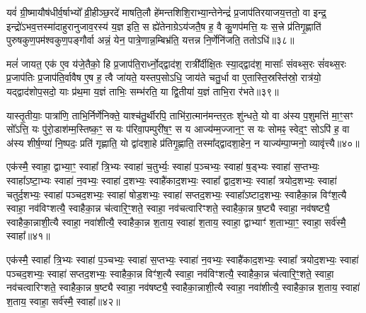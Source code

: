 यवं॑ ग्री॒ष्मायौष॑धीर्व॒र्\mbox{}षाभ्यो᳚ व्री॒हीञ्छ॒रदे॑ माषति॒लौ हे॑मन्तशिशि॒राभ्या॒न्तेनेन्द्रं॑ प्र॒जाप॑तिरयाजय॒त्ततो॒ वा इन्द्र॒ इन्द्रो॑\-ऽभव॒त्तस्मा॑दाहुरानुजाव॒रस्य॑ य॒ज्ञ इति॒ स ह्ये॑तेनाग्रे\-ऽय॑जतै॒ष ह॒ वै कु॒णप॑मत्ति॒ यः स॒त्त्रे प्र॑तिगृ॒ह्णाति॑ पुरुषकुण॒पम॑श्वकुण॒पङ्गौर्वा अन्नं॒ येन॒ पात्रे॒णान्न॒म्बिभ्र॑ति॒ यत्तन्न नि॒र्णेनि॑जति॒ ततो\-ऽधि॑॥३८॥

मलं॑ जायत॒ एक॑ ए॒व य॑जे॒तैको॒ हि प्र॒जाप॑ति॒रार्ध्नो॒द्द्वाद॑श॒ रात्री᳚र्दीक्षि॒तः स्या॒द्द्वाद॑श॒ मासाः᳚ संवथ्स॒रः सं॑वथ्स॒रः प्र॒जाप॑तिः प्र॒जाप॑ति॒र्वावैष ए॒ष ह॒ त्वै जा॑यते॒ यस्तप॒सो\-ऽधि॒ जाय॑ते चतु॒र्धा वा ए॒तास्ति॒स्रस्ति॑स्रो॒ रात्र॑यो॒ यद्द्वाद॑शोप॒सदो॒ याः प्र॑थ॒मा य॒ज्ञं ताभिः॒ सम्भ॑रति॒ या द्वि॒तीया॑ य॒ज्ञं ताभि॒रा र॑भते॥३९॥

यास्तृ॒तीयाः॒ पात्रा॑णि॒ ताभि॒र्निर्णे॑निक्ते॒ याश्च॑तु॒र्थीरपि॒ ताभि॑रा॒त्मान॑मन्तर॒तः शु॑न्धते॒ यो वा अ॑स्य प॒शुमत्ति॑ मा॒ꣳ॒सꣳ सो᳚\-ऽत्ति॒ यः पु॑रो॒डाश॑म्म॒स्तिष्क॒ꣳ॒ स यः प॑रिवा॒पम्पुरी॑ष॒ꣳ॒ स य आज्य॑म्म॒ज्जान॒ꣳ॒ स यः सोमꣴ॒ स्वेद॒ꣳ॒ सो\-ऽपि॑ ह॒ वा अ॑स्य शीर्\mbox{}ष॒ण्या॑ नि॒ष्पदः॒ प्रति॑ गृह्णाति॒ यो द्वा॑दशा॒हे प्र॑तिगृ॒ह्णाति॒ तस्मा᳚द्द्वादशा॒हेन॒ न याज्य॑म्पा॒प्मनो॒ व्यावृ॑त्त्यै॥४०॥

{\anuvakamend[{अय॑च्छ॒दधि॑ रभते द्वादशा॒हेन॑ च॒त्वारि॑ च॥10॥}]}

एक॑स्मै॒ स्वाहा॒ द्वाभ्या॒ꣳ॒ स्वाहा᳚ त्रि॒भ्यः स्वाहा॑ च॒तुर्भ्यः॒ स्वाहा॑ प॒ञ्चभ्यः॒ स्वाहा॑ ष॒ड्भ्यः स्वाहा॑ स॒प्तभ्यः॒ स्वाहा᳚\-ऽष्टा॒भ्यः स्वाहा॑ न॒वभ्यः॒ स्वाहा॑ द॒शभ्यः॒ स्वाहै॑काद॒शभ्यः॒ स्वाहा᳚ द्वाद॒शभ्यः॒ स्वाहा᳚ त्रयोद॒शभ्यः॒ स्वाहा॑ चतुर्द॒शभ्यः॒ स्वाहा॑ पञ्चद॒शभ्यः॒ स्वाहा॑ षोड॒शभ्यः॒ स्वाहा॑ सप्तद॒शभ्यः॒ स्वाहा᳚\-ऽष्टाद॒शभ्यः॒ स्वाहैका॒न्न विꣳ॑श॒त्यै स्वाहा॒ नव॑विꣳशत्यै॒ स्वाहैका॒न्न च॑त्वारि॒ꣳ॒शते॒ स्वाहा॒ नव॑चत्वारिꣳशते॒ स्वाहैका॒न्न ष॒ष्ट्यै स्वाहा॒ नव॑षष्ट्यै॒ स्वाहैका॒न्नाशी॒त्यै स्वाहा॒ नवा॑शीत्यै॒ स्वाहैका॒न्न श॒ताय॒ स्वाहा॑ श॒ताय॒ स्वाहा॒ द्वाभ्याꣳ॑ श॒ताभ्या॒ꣳ॒ स्वाहा॒ सर्व॑स्मै॒ स्वाहा᳚॥४१॥

{}

एक॑स्मै॒ स्वाहा᳚ त्रि॒भ्यः स्वाहा॑ प॒ञ्चभ्यः॒ स्वाहा॑ स॒प्तभ्यः॒ स्वाहा॑ न॒वभ्यः॒ स्वाहै॑काद॒शभ्यः॒ स्वाहा᳚ त्रयोद॒शभ्यः॒ स्वाहा॑ पञ्चद॒शभ्यः॒ स्वाहा॑ सप्तद॒शभ्यः॒ स्वाहैका॒न्न विꣳ॑श॒त्यै स्वाहा॒ नव॑विꣳशत्यै॒ स्वाहैका॒न्न च॑त्वारि॒ꣳ॒शते॒ स्वाहा॒ नव॑चत्वारिꣳशते॒ स्वाहैका॒न्न ष॒ष्ट्यै स्वाहा॒ नव॑षष्ट्यै॒ स्वाहैका॒न्नाशी॒त्यै स्वाहा॒ नवा॑शीत्यै॒ स्वाहैका॒न्न श॒ताय॒ स्वाहा॑ श॒ताय॒ स्वाहा॒ सर्व॑स्मै॒ स्वाहा᳚॥४२॥

